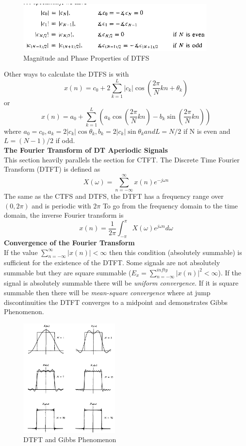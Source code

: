 \documentclass{article} %
\begin{document}
	\begin{figure}[h]
	\centering
	\includegraphics[width=10cm]{sym}
	\caption{Magnitude and Phase Properties of DTFS}
	\end{figure}

	Other ways to calculate the DTFS is with
	\begin{equation}
	x(n) = c_0 + 2\sum_{k=1}^{L}|c_k|\cos (\frac{2\pi}{N}kn + \theta_k)
	\end{equation}
	or 
	\begin{equation}
	x(n) = a_0 + \sum_{k=1}^{L}(a_k \cos(\frac{2\pi}{N}kn)- b_k \sin(\frac{2\pi}{N}kn))
	\end{equation}
	where $a_0 = c_0, a_k = 2|c_k|\cos \theta_k, b_k = 2|c_k|\sin \theta_k and L = N/2$ if N is even and $L = (N-1)/2$ if odd.\\
	\textbf{The Fourier Transform of DT Aperiodic Signals}\\
	This section heavily parallels the section for CTFT. The Discrete Time Fourier Transform (DTFT) is defined as
	\begin{equation}
	X(\omega) = \sum_{n = -\infty}^{\infty}x(n)e^{-j\omega n}
	\end{equation}
	The same as the CTFS and DTFS, the DTFT has a frequency range over $(0, 2\pi)$ and is periodic with $2\pi$
	To go from the frequency domain to the time domain, the inverse Fourier transform is
	\begin{equation}
	x(n) = \frac{1}{2\pi}\int_{-\pi}^{\pi}X(\omega)e^{j\omega n}d\omega
	\end{equation}
	\textbf{Convergence of the Fourier Transform}\\
	If the value $\sum_{n=-\infty}^{\infty}|x(n)| < \infty$ then this condition (absolutely summable) is sufficient for the existence of the DTFT. Some
	signals are not absolutely summable but they are square summable ($E_x = \sum_{n=-\infty}^{infty}|x(n)|^2 < \infty$). If the signal is
	absolutely summable there will be \textit{uniform convergence}. If it is square summable then there will be \textit{mean-square convergence}
	where at jump discontinuities the DTFT converges to a midpoint and demonstrates Gibbs Phenomenon.
	\begin{figure}[h]
	\centering
	\includegraphics[width=5cm]{gibbs}
	\caption{DTFT and Gibbs Phenomenon}
	\end{figure}
\end{document}

